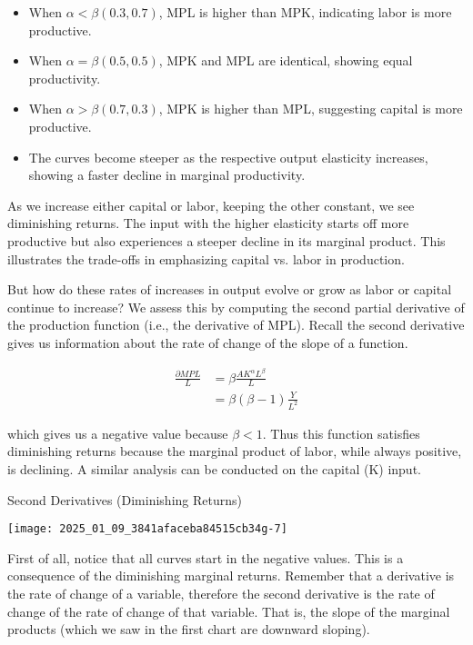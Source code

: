 \documentclass[10pt]{article}
\begin{document}
\begin{itemize}
  \item When $\alpha<\beta(0.3,0.7)$, MPL is higher than MPK, indicating labor is more productive.
  \item When $\alpha=\beta(0.5,0.5)$, MPK and MPL are identical, showing equal productivity.
  \item When $\alpha>\beta(0.7,0.3)$, MPK is higher than MPL, suggesting capital is more productive.
  \item The curves become steeper as the respective output elasticity increases, showing a faster decline in marginal productivity.
\end{itemize}

As we increase either capital or labor, keeping the other constant, we see diminishing returns. The input with the higher elasticity starts off more productive but also experiences a steeper decline in its marginal product. This illustrates the trade-offs in emphasizing capital vs. labor in production.

But how do these rates of increases in output evolve or grow as labor or capital continue to increase? We assess this by computing the second partial derivative of the production function (i.e., the derivative of MPL). Recall the second derivative gives us information about the rate of change of the slope of a function.

\begin{align}
  \frac{\partial M P L}{L} &= \beta \frac{A K^{\alpha} L^{\beta}}{L} \\
  &=\beta(\beta-1) \frac{Y}{L^{2}}
\end{align}

 which gives us a negative value because $\beta<1$. Thus this function satisfies diminishing returns because the marginal product of labor, while always positive, is declining. A similar analysis can be conducted on the capital (K) input.

Second Derivatives (Diminishing Returns)

\texttt{[image: 2025\_01\_09\_3841afaceba84515cb34g-7]}

First of all, notice that all curves start in the negative values. This is a consequence of the diminishing marginal returns. Remember that a derivative is the rate of change of a variable, therefore the second derivative is the rate of change of the rate of change of that variable. That is, the slope of the marginal products (which we saw in the first chart are downward sloping). 
\end{document}
